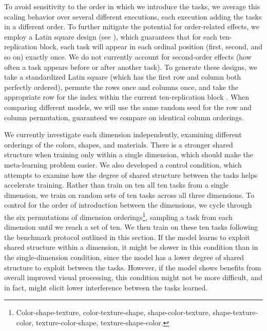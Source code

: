 To avoid sensitivity to the order in which we introduce the tasks, we average this scaling behavior over several different executions, each execution adding the tasks in a different order. To further mitigate the potential for order-related effects, we employ a Latin square design (see \cite[][ch. 9]{Bailey2008}), which guarantees that for each ten-replication block, each task will appear in each ordinal position (first, second, and so on) exactly once. We do not currently account for second-order effects (how often a task appears before or after another task). To generate these designs, we take a standardized Latin square (which has the first row and column both perfectly ordered), permute the rows once and columns once, and take the appropriate row for the index within the current ten-replication block \parencite{InteractiveStatisticalPages}. When comparing different models, we will use the same random seed for the row and column permutation, guaranteed we compare on identical column orderings. 

We currently investigate each dimension independently, examining different orderings of the colors, shapes, and materials. There is a stronger shared structure when training only within a single dimension, which should make the meta-learning problem easier. We also developed a control condition, which attempts to examine how the degree of shared structure between the tasks helps accelerate training. Rather than train on ten all ten tasks from a single dimension, we train on random sets of ten tasks across all three dimensions. To control for the order of introduction between the dimensions, we cycle through the six permutations of dimension orderings\footnote{Color-shape-texture, color-texture-shape, shape-color-texture, shape-texture-color, texture-color-shape, texture-shape-color.}, sampling a task from each dimension until we reach a set of ten. We then train on these ten tasks following the benchmark protocol outlined in this section. If the model learns to exploit shared structure within a dimension, it might be slower in this condition than in the single-dimension condition, since the model has a lower degree of shared structure to exploit between the tasks. However, if the model shows benefits from overall improved visual processing, this condition might not be more difficult, and in fact, might elicit lower interference between the tasks learned.

